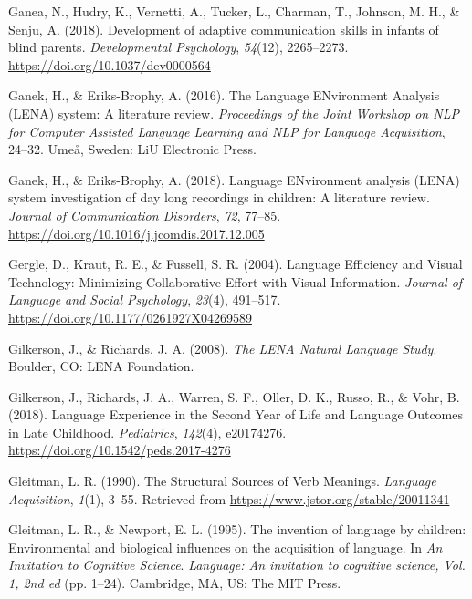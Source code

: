 \documentclass[
  man,floatsintext]{apa6}
\newlength{\cslhangindent}
\newlength{\cslentryspacingunit} %
\newenvironment{CSLReferences}[2] %
 {%
  \setlength{\parindent}{0pt}
  \ifodd #1
  \let\oldpar\par
  \def\par{\hangindent=\cslhangindent\oldpar}
  \fi
  \setlength{\parskip}{#2\cslentryspacingunit}
 }%
 {}
\begin{document}
\begin{CSLReferences}{1}{0}
\leavevmode{}%
Ganea, N., Hudry, K., Vernetti, A., Tucker, L., Charman, T., Johnson, M. H., \& Senju, A. (2018). Development of adaptive communication skills in infants of blind parents. \emph{Developmental Psychology}, \emph{54}(12), 2265--2273. \url{https://doi.org/10.1037/dev0000564}

\leavevmode{}%
Ganek, H., \& Eriks-Brophy, A. (2016). The {Language ENvironment Analysis} ({LENA}) system: {A} literature review. \emph{Proceedings of the Joint Workshop on {NLP} for {Computer Assisted Language Learning} and {NLP} for {Language Acquisition}}, 24--32. Ume{å}, Sweden: LiU Electronic Press.

\leavevmode{}%
Ganek, H., \& Eriks-Brophy, A. (2018). Language {ENvironment} analysis ({LENA}) system investigation of day long recordings in children: {A} literature review. \emph{Journal of Communication Disorders}, \emph{72}, 77--85. \url{https://doi.org/10.1016/j.jcomdis.2017.12.005}

\leavevmode{}%
Gergle, D., Kraut, R. E., \& Fussell, S. R. (2004). Language {Efficiency} and {Visual Technology}: {Minimizing Collaborative Effort} with {Visual Information}. \emph{Journal of Language and Social Psychology}, \emph{23}(4), 491--517. \url{https://doi.org/10.1177/0261927X04269589}

\leavevmode{}%
Gilkerson, J., \& Richards, J. A. (2008). \emph{The {LENA Natural Language Study}}. Boulder, CO: LENA Foundation.

\leavevmode{}%
Gilkerson, J., Richards, J. A., Warren, S. F., Oller, D. K., Russo, R., \& Vohr, B. (2018). Language {Experience} in the {Second Year} of {Life} and {Language Outcomes} in {Late Childhood}. \emph{Pediatrics}, \emph{142}(4), e20174276. \url{https://doi.org/10.1542/peds.2017-4276}

\leavevmode{}%
Gleitman, L. R. (1990). The {Structural Sources} of {Verb Meanings}. \emph{Language Acquisition}, \emph{1}(1), 3--55. Retrieved from \url{https://www.jstor.org/stable/20011341}

\leavevmode{}%
Gleitman, L. R., \& Newport, E. L. (1995). The invention of language by children: {Environmental} and biological influences on the acquisition of language. In \emph{An Invitation to Cognitive Science}. \emph{Language: {An} invitation to cognitive science, {Vol}. 1, 2nd ed} (pp. 1--24). Cambridge, MA, US: The MIT Press.


\end{CSLReferences}
\end{document}
